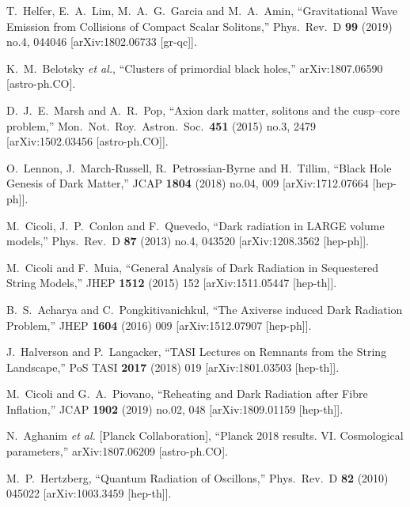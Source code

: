 \documentclass[11pt,a4paper]{article}
\begin{document}
\begin{thebibliography}{99}
  T.~Helfer, E.~A.~Lim, M.~A.~G.~Garcia and M.~A.~Amin,
  ``Gravitational Wave Emission from Collisions of Compact Scalar Solitons,''
  Phys.\ Rev.\ D {\bf 99} (2019) no.4,  044046
  [arXiv:1802.06733 [gr-qc]].

  K.~M.~Belotsky {\it et al.},
  ``Clusters of primordial black holes,''
  arXiv:1807.06590 [astro-ph.CO].

  D.~J.~E.~Marsh and A.~R.~Pop,
  ``Axion dark matter, solitons and the cusp–core problem,''
  Mon.\ Not.\ Roy.\ Astron.\ Soc.\  {\bf 451} (2015) no.3,  2479
  [arXiv:1502.03456 [astro-ph.CO]].
  
  O.~Lennon, J.~March-Russell, R.~Petrossian-Byrne and H.~Tillim,
  ``Black Hole Genesis of Dark Matter,''
  JCAP {\bf 1804} (2018) no.04,  009
  [arXiv:1712.07664 [hep-ph]].
  
  M.~Cicoli, J.~P.~Conlon and F.~Quevedo,
  ``Dark radiation in LARGE volume models,''
  Phys.\ Rev.\ D {\bf 87} (2013) no.4,  043520
  [arXiv:1208.3562 [hep-ph]].
  
  M.~Cicoli and F.~Muia,
  ``General Analysis of Dark Radiation in Sequestered String Models,''
  JHEP {\bf 1512} (2015) 152
  [arXiv:1511.05447 [hep-th]].
  
  B.~S.~Acharya and C.~Pongkitivanichkul,
  ``The Axiverse induced Dark Radiation Problem,''
  JHEP {\bf 1604} (2016) 009
  [arXiv:1512.07907 [hep-ph]].
  
  J.~Halverson and P.~Langacker,
  ``TASI Lectures on Remnants from the String Landscape,''
  PoS TASI {\bf 2017} (2018) 019
  [arXiv:1801.03503 [hep-th]].
  
  M.~Cicoli and G.~A.~Piovano,
  ``Reheating and Dark Radiation after Fibre Inflation,''
  JCAP {\bf 1902} (2019) no.02,  048
  [arXiv:1809.01159 [hep-th]].
  
  N.~Aghanim {\it et al.} [Planck Collaboration],
  ``Planck 2018 results. VI. Cosmological parameters,''
  arXiv:1807.06209 [astro-ph.CO].
  
  M.~P.~Hertzberg,
  ``Quantum Radiation of Oscillons,''
  Phys.\ Rev.\ D {\bf 82} (2010) 045022
  [arXiv:1003.3459 [hep-th]].
  

\end{thebibliography}
\end{document}
